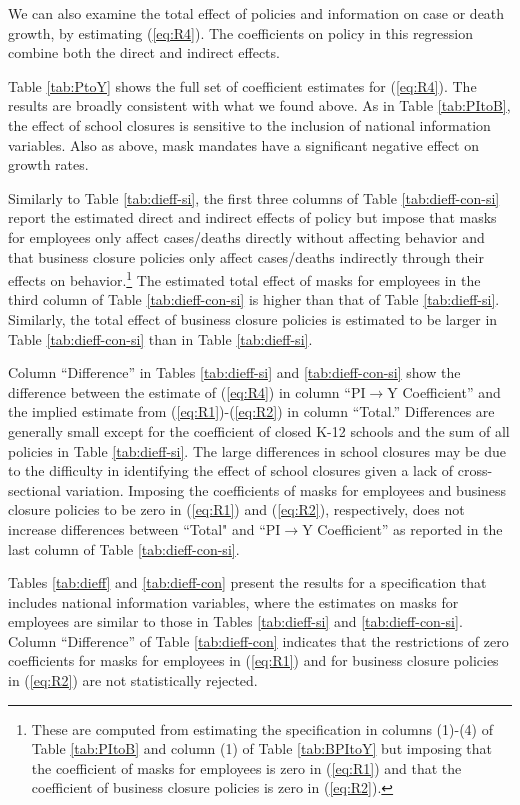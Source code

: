 \documentclass[11pt,reqno,letter]{amsart}
\theoremstyle{definition}
\renewcommand{\to}{{\rightarrow}}
\begin{document}
We can also examine the total effect of policies and information on
case  or death growth, by estimating (\ref{eq:R4}). The coefficients on policy
in this regression combine both the direct and indirect effects.

Table \ref{tab:PtoY} shows
the full set of coefficient estimates for
(\ref{eq:R4}). The results are broadly consistent with what we found
above.  As in Table \ref{tab:PItoB}, the effect of school closures is
sensitive to the inclusion of national information variables.  Also as
above, mask mandates have a significant negative effect on growth
rates.

Similarly to Table  \ref{tab:dieff-si}, the first three columns of  Table \ref{tab:dieff-con-si} report  the estimated direct and indirect effects of policy but impose that masks for employees only affect cases/deaths directly without affecting behavior and that business closure policies only affect  cases/deaths indirectly through their effects on behavior.\footnote{These are computed from estimating the specification in columns (1)-(4) of
Table \ref{tab:PItoB} and column (1) of Table \ref{tab:BPItoY} but imposing that the coefficient of masks for employees is zero in (\ref{eq:R1}) and that the coefficient of business closure policies is zero in (\ref{eq:R2}).} The estimated total effect of masks for employees in the third column of Table \ref{tab:dieff-con-si} is higher than that of Table  \ref{tab:dieff-si}. Similarly, the total effect of business closure policies is estimated to be larger in Table \ref{tab:dieff-con-si} than in  Table  \ref{tab:dieff-si}.

Column ``Difference''  in Tables   \ref{tab:dieff-si} and \ref{tab:dieff-con-si}  show the
difference between the estimate of (\ref{eq:R4}) in column  ``PI$\to$Y Coefficient''   and the implied estimate from
(\ref{eq:R1})-(\ref{eq:R2}) in   column ``Total.''   Differences  are generally small except for the coefficient of closed K-12 schools and  the sum of all policies in Table   \ref{tab:dieff-si}. The large differences in school closures  may be due to the  difficulty in identifying the effect of school closures given a lack of cross-sectional variation. Imposing the coefficients of masks for employees and business closure policies to be zero in (\ref{eq:R1}) and  (\ref{eq:R2}), respectively, does not increase differences between  ``Total" and  ``PI$\to$Y Coefficient''  as reported in the last column of  Table \ref{tab:dieff-con-si}.

 Tables  \ref{tab:dieff} and \ref{tab:dieff-con}  present the results for a specification that includes national information variables, where the estimates on masks for employees are similar to those in  Tables  \ref{tab:dieff-si} and \ref{tab:dieff-con-si}. Column ``Difference''  of Table \ref{tab:dieff-con} indicates that the restrictions of zero coefficients for masks for employees in (\ref{eq:R1}) and for business closure policies in  (\ref{eq:R2}) are not statistically rejected.
\end{document}
